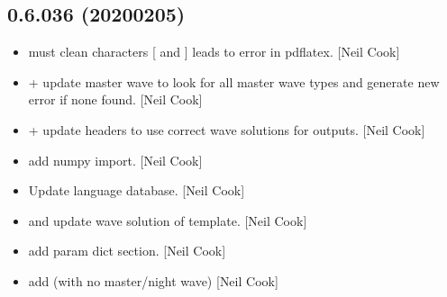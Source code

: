 \documentclass[a4paper,10pt,english]{report}
\begin{document}
\subsection{0.6.036 (2020\sphinxhyphen{}02\sphinxhyphen{}05)}
\label{\detokenize{misc/changelog:id2}}\begin{itemize}
\item {} 
 \sphinxhyphen{} must clean characters {[} and {]} \sphinxhyphen{} leads to error in
pdflatex. {[}Neil Cook{]}

\item {} 
 +  \sphinxhyphen{} update master wave to
look for all master wave types and generate new error if none found.
{[}Neil Cook{]}

\item {} 
 +  \sphinxhyphen{}
update headers to use correct wave solutions for outputs. {[}Neil Cook{]}

\item {} 
 \sphinxhyphen{} add numpy import. {[}Neil Cook{]}

\item {} 
Update language database. {[}Neil Cook{]}

\item {} 
 and
 \sphinxhyphen{} update wave solution of template. {[}Neil
Cook{]}

\item {} 
 \sphinxhyphen{} add param dict section. {[}Neil Cook{]}

\item {} 
 \sphinxhyphen{} add  (with no master/night wave)
{[}Neil Cook{]}

\end{itemize}
\end{document}
